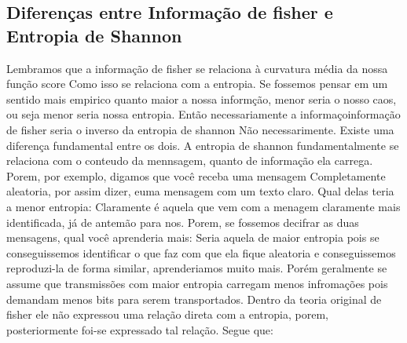\subsection{Diferenças entre Informação de fisher e Entropia de Shannon}

Lembramos que a informação de fisher se relaciona à curvatura média da nossa função score Como isso
se relaciona com a entropia. Se fossemos pensar em um sentido mais empirico quanto maior a nossa
informção, menor seria o nosso caos, ou seja menor seria nossa entropia. Então necessariamente a
informaçoinformação de fisher seria o inverso da entropia de shannon Não necessarimente. Existe uma
diferença fundamental entre os dois. A entropia de shannon fundamentalmente se relaciona com o
conteudo da mennsagem, quanto de informação ela carrega. Porem, por exemplo, digamos que você receba
uma mensagem Completamente aleatoria, por assim dizer, euma mensagem com um texto claro. Qual delas
teria a menor entropia: Claramente é aquela que vem com a menagem claramente mais identificada, já
de antemão para nos. Porem, se fossemos decifrar as duas mensagens, qual você aprenderia mais: Seria
aquela de maior entropia pois se conseguissemos identificar o que faz com que ela fique aleatoria e
conseguissemos reproduzi-la de forma similar, aprenderiamos muito mais. Porém geralmente se assume
que transmissões com maior entropia carregam menos infromações pois demandam menos bits para serem
transportados. Dentro da teoria original de fisher ele não expressou uma relação direta com a
entropia, porem, posteriormente foi-se expressado tal relação. Segue que:

